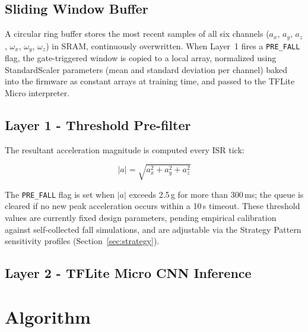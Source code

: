 \subsection{Sliding Window Buffer}

A circular ring buffer stores the most recent samples of all six channels (\(a_x\), \(a_y\), \(a_z\), \(\omega_x\), \(\omega_y\), \(\omega_z\)) in SRAM, continuously overwritten. When Layer~1 fires a \texttt{PRE\_FALL} flag, the gate-triggered window is copied to a local array, normalized using Standard\-Scaler parameters (mean and standard deviation per channel) baked into the firmware as constant arrays at training time, and passed to the TFLite Micro interpreter.

\subsection{Layer 1 - Threshold Pre-filter}

The resultant acceleration magnitude is computed every ISR tick:

\begin{equation}
    |a| = \sqrt{a_x^2 + a_y^2 + a_z^2}
\end{equation}

The \texttt{PRE\_FALL} flag is set when \(|a|\) exceeds 2.5\,g for more than 300\,ms; the queue is cleared if no new peak acceleration occurs within a 10\,s timeout. These threshold values are currently fixed design parameters, pending empirical calibration against self-collected fall simulations, and are adjustable via the Strategy Pattern sensitivity profiles (Section~\ref{sec:strategy}).

\subsection{Layer 2 - TFLite Micro CNN Inference}



\section{Algorithm}

